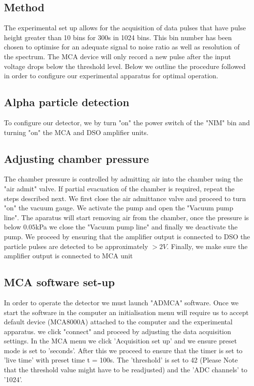 \documentclass[a4paper]{article}
\begin{document}
\begin{multicols}{2}
\section{Method}
The experimental set up allows for the acquisition of data pulses that have pulse height greater than 10 bins for 300s in 1024 bins. 
This bin number has been chosen to optimise for an adequate signal to noise ratio as well as resolution of the spectrum.
The MCA device will only record a new pulse after the input voltage drops below the threshold level\cite{SPA}.
Below we outline the procedure followed in order to configure our experimental apparatus for optimal operation. 

\subsection{Alpha particle detection}
To configure our detector, we by turn "on" the power switch of the "NIM" bin and turning "on" the MCA and DSO amplifier units.
\subsection{Adjusting chamber pressure}
The chamber pressure is controlled by admitting air into the chamber using the "air admit" valve. If partial evacuation of the chamber is required, repeat the steps described next.
We first close the air admittance valve and proceed to turn "on" the vacuum gauge. We activate the pump and open the "Vacuum pump line". The aparatus will start removing air from the chamber, once the pressure is below $0.05$kPa we close the "Vacuum pump line" and finally we deactivate the pump. 
We proceed by ensuring that the amplifier output is connected to DSO the particle pulses are detected to be approximately $> 2V$. Finally, we make sure the amplifier output is connected to MCA unit

\subsection{MCA software set-up}
In order to operate the detector we must launch "ADMCA" software. Once we start the software in the computer an initialisation menu will require us to accept default device (MCA8000A) attached to the computer and the experimental apparatus. we click "connect" and proceed by adjusting the data acquisition settings.
In the MCA menu we click 'Acquisition set up' and we ensure preset mode is set to 'seconds'. After this we proceed to ensure that the timer is set to 'live time' with preset time t = 100s.
The 'threshold' is set to 42 (Please Note that the threshold value might have to be readjusted) and the 'ADC channels' to '1024'.


\end{multicols}
\end{document}
